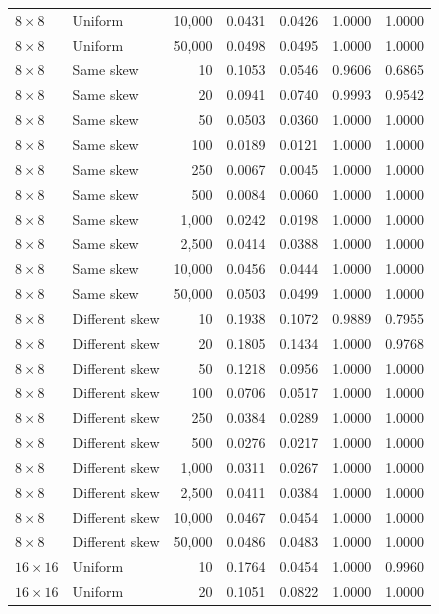 \begin{longtable}{@{}llrrrrr@{}}
\(8\times8\) & Uniform & 10,000 & 0.0431 & 0.0426 & 1.0000 & 1.0000\\
\(8\times8\) & Uniform & 50,000 & 0.0498 & 0.0495 & 1.0000 & 1.0000\\
\(8\times8\) & Same skew & 10 & 0.1053 & 0.0546 & 0.9606 & 0.6865\\
\(8\times8\) & Same skew & 20 & 0.0941 & 0.0740 & 0.9993 & 0.9542\\
\(8\times8\) & Same skew & 50 & 0.0503 & 0.0360 & 1.0000 & 1.0000\\
\(8\times8\) & Same skew & 100 & 0.0189 & 0.0121 & 1.0000 & 1.0000\\
\(8\times8\) & Same skew & 250 & 0.0067 & 0.0045 & 1.0000 & 1.0000\\
\(8\times8\) & Same skew & 500 & 0.0084 & 0.0060 & 1.0000 & 1.0000\\
\(8\times8\) & Same skew & 1,000 & 0.0242 & 0.0198 & 1.0000 & 1.0000\\
\(8\times8\) & Same skew & 2,500 & 0.0414 & 0.0388 & 1.0000 & 1.0000\\
\(8\times8\) & Same skew & 10,000 & 0.0456 & 0.0444 & 1.0000 & 1.0000\\
\(8\times8\) & Same skew & 50,000 & 0.0503 & 0.0499 & 1.0000 & 1.0000\\
\(8\times8\) & Different skew & 10 & 0.1938 & 0.1072 & 0.9889 & 0.7955\\
\(8\times8\) & Different skew & 20 & 0.1805 & 0.1434 & 1.0000 & 0.9768\\
\(8\times8\) & Different skew & 50 & 0.1218 & 0.0956 & 1.0000 & 1.0000\\
\(8\times8\) & Different skew & 100 & 0.0706 & 0.0517 & 1.0000 & 1.0000\\
\(8\times8\) & Different skew & 250 & 0.0384 & 0.0289 & 1.0000 & 1.0000\\
\(8\times8\) & Different skew & 500 & 0.0276 & 0.0217 & 1.0000 & 1.0000\\
\(8\times8\) & Different skew & 1,000 & 0.0311 & 0.0267 & 1.0000 & 1.0000\\
\(8\times8\) & Different skew & 2,500 & 0.0411 & 0.0384 & 1.0000 & 1.0000\\
\(8\times8\) & Different skew & 10,000 & 0.0467 & 0.0454 & 1.0000 & 1.0000\\
\(8\times8\) & Different skew & 50,000 & 0.0486 & 0.0483 & 1.0000 & 1.0000\\
\midrule
\(16\times16\) & Uniform & 10 & 0.1764 & 0.0454 & 1.0000 & 0.9960\\
\(16\times16\) & Uniform & 20 & 0.1051 & 0.0822 & 1.0000 & 1.0000\\

\end{longtable}
